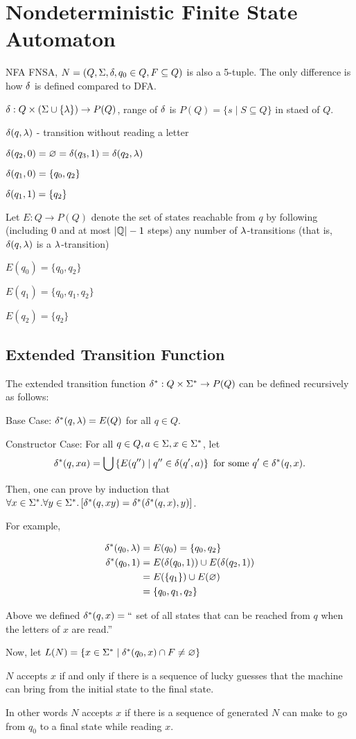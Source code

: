 \documentclass[11pt, cyan, night, 0.5in]{hw}
\begin{document}


\section{Nondeterministic Finite State Automaton}

NFA FNSA, $N=(Q, \Sigma, \delta, q_0\in Q, F\subseteq Q)$ is also a 5-tuple. The only difference is how $\delta$ is defined compared to DFA.

$\delta:Q\times \left(\Sigma\cup\{\lambda\}\right)\to P(Q)$, range of $\delta$ is $P(Q)=\{s\mid S\subseteq Q\}$ in staed of $Q$.

$\delta(q,\lambda)$ - transition without reading a letter


$\delta(q_2,0)=\varnothing=\delta(q_3,1)=\delta(q_2,\lambda)$

$\delta(q_1,0)=\{q_0,q_2\}$

$\delta(q_1,1)=\{q_2\}$

Let $E: Q\to P(Q)$ denote the set of states reachable from $q$ by following (including 0 and at most $|\mathbb{Q}|-1$ steps) any number of $\lambda$-transitions (that is, $\delta(q,\lambda)$ is a $\lambda$-transition)

$E(q_0)=\{q_0,q_2\}$

$E(q_1)=\{q_0,q_1,q_2\}$

$E(q_2)=\{q_2\}$

\subsection{Extended Transition Function}

The extended transition function $\delta^*:Q\times \Sigma^*\to P(Q)$ can be defined recursively as follows:

Base Case: $\delta^*(q, \lambda)=E(Q)$ for all $q\in Q$.

Constructor Case: For all $q\in Q, a\in \Sigma, x\in\Sigma^*$, let \[\delta^*(q,xa)=\bigcup\left\{E(q'')\mid q''\in\delta(q',a)\right\}\text{ for some }q'\in\delta^*(q,x).\]

Then, one can prove by induction that $\forall x\in\Sigma^*. \forall y\in\Sigma^*. \left[\delta^*(q,xy)=\delta^*(\delta^*(q,x),y)\right]$.

For example, 

\begin{align*}
    \delta^*(q_0,\lambda)&=E(q_0) = \{q_0,q_2\}\\
    \delta^*(q_0,1)&=E(\delta(q_0, 1))\cup E(\delta(q_2, 1))\\
    &= E(\{q_1\})\cup E(\varnothing)\\
    &=\{q_0,q_1,q_2\}
\end{align*}

Above we defined $\delta^*(q,x)=``$ set of all states that can be reached from $q$ when the letters of $x$ are read.''

Now, let $L(N)=\{x\in\Sigma^*\mid \delta^*(q_0, x)\cap F\neq \varnothing\}$

$N$ accepts $x$ if and only if there is a sequence of lucky guesses that the machine can bring from the initial state to the final state.

In other words $N$ accepts $x$ if there is a sequence of generated $N$ can make to go from $q_0$ to a final state while reading $x$.
\end{document}
